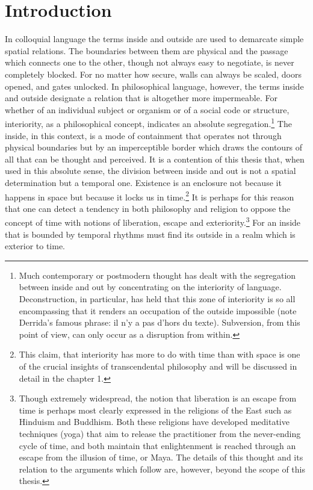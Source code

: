 \chapter*{Introduction}

In colloquial language the terms inside and outside are used to demarcate simple spatial relations. The boundaries between them are physical and the passage which connects one to the other, though not always easy to negotiate, is never completely blocked. For no matter how secure, walls can always be scaled, doors opened, and gates unlocked. In philosophical language, however, the terms inside and outside designate a relation that is altogether more impermeable. For whether of an individual subject or organism or of a social code or structure, interiority, as a philosophical concept, indicates an absolute segregation.\footnote{Much contemporary or postmodern thought has dealt with the segregation between inside and out by concentrating on the interiority of language. Deconstruction, in particular, has held that this zone of interiority is so all encompassing that it renders an occupation of the outside impossible (note Derrida's famous phrase: il n'y a pas d'hors du texte). Subversion, from this point of view, can only occur as a disruption from within.} The inside, in this context, is a mode of containment that operates not through physical boundaries but by an imperceptible border which draws the contours of all that can be thought and perceived. It is a contention of this thesis that, when used in this absolute sense, the division between inside and out is not a spatial determination but a temporal one. Existence is an enclosure not because it happens in space but because it locks us in time.\footnote{This claim, that interiority has more to do with time than with space is one of the crucial insights of transcendental philosophy and will be discussed in detail in the chapter 1.} It is perhaps for this reason that one can detect a tendency in both philosophy and religion to oppose the concept of time with notions of liberation, escape and exteriority.\footnote{Though extremely widespread, the notion that liberation is an escape from time is perhaps most clearly expressed in the religions of the East such as Hinduism and Buddhism. Both these religions have developed meditative techniques (yoga) that aim to release the practitioner from the never-ending cycle of time, and both maintain that enlightenment is reached through an escape from the illusion of time, or Maya. The details of this thought and its relation to the arguments which follow are, however, beyond the scope of this thesis.} For an inside that is bounded by temporal rhythms must find its outside in a realm which is exterior to time. 

